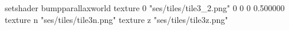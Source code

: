 setshader bumpparallaxworld
texture 0 "ses/tiles/tile3_2.png" 0 0 0 0.500000
texture n "ses/tiles/tile3n.png"
texture z "ses/tiles/tile3z.png"

